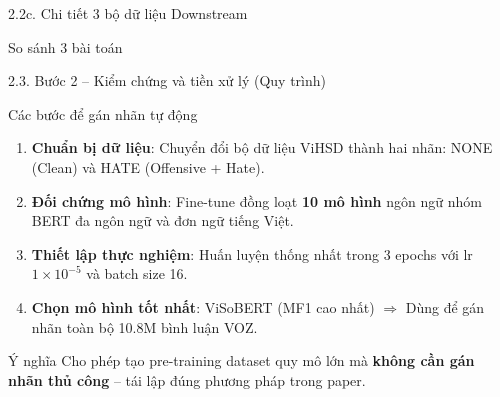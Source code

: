 \documentclass[11pt, aspectratio=169]{beamer}
\begin{document}
\begin{frame}[fragile, shrink=10]{2.2c. Chi tiết 3 bộ dữ liệu Downstream}
\vspace{0.3cm}
\begin{block}{So sánh 3 bài toán}
  \centering
\end{block}
\end{frame}

\begin{frame}[fragile, shrink=5]{2.3. Bước 2 -- Kiểm chứng và tiền xử lý (Quy trình)}

\begin{block}{Các bước để gán nhãn tự động}
  \begin{enumerate}
    \item \textbf{Chuẩn bị dữ liệu}: Chuyển đổi bộ dữ liệu ViHSD thành hai nhãn: NONE (Clean) và HATE (Offensive + Hate).
    \item \textbf{Đối chứng mô hình}: Fine-tune đồng loạt \textbf{10 mô hình} ngôn ngữ nhóm BERT đa ngôn ngữ và đơn ngữ tiếng Việt.
    \item \textbf{Thiết lập thực nghiệm}: Huấn luyện thống nhất trong 3 epochs với lr $1 \times 10^{-5}$ và batch size 16.
    \item \textbf{Chọn mô hình tốt nhất}: ViSoBERT (MF1 cao nhất) $\Rightarrow$ Dùng để gán nhãn toàn bộ 10.8M bình luận VOZ.
  \end{enumerate}
\end{block}

\vspace{0.2cm}
\begin{block}{Ý nghĩa}
  Cho phép tạo pre-training dataset quy mô lớn mà \textbf{không cần gán nhãn thủ công} -- tái lập đúng phương pháp trong paper.
\end{block}
\end{frame}
\end{document}
